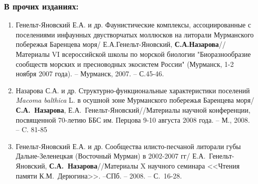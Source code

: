 {\begin{small}
\subsubsection*{В прочих изданиях:}
\begin{enumerate}
\item Генельт-Яновский Е.А. и др. Фаунистические комплексы, ассоциированные с поселениями инфаунных двустворчатых моллюсков на литорали Мурманского побережья Баренцева моря/ Е.А.Генельт-Яновский, \textbf{С.А.Назарова}// Материалы VI всероссийской школы по морской биологии "Биоразнообразие сообществ морских и пресноводных экосистем России" (Мурманск, 1-2 ноября 2007 года). -- Мурманск, 2007. -- С.45-46.
\item Назарова С.А. и др. Структурно-функциональные характеристики поселений \textit{Macoma balthica} L. в осушной зоне Мурманского побережья Баренцева моря/ \textbf{С.А.~Назарова}, Е.А.~Генельт-Яновский//Материалы научной конференции, посвященной 70-летию ББС им. Перцова 9-10 августа 2008 года. -- М., 2008. -- C. 81-85
\item Генельт-Яновский Е.А. и др. Сообщества илисто-песчаной литорали губы Дальне-Зеленецкая (Восточный Мурман) в 2002-2007 гг/ Е.А.~Генельт-Яновский, \textbf{С.А.~Назарова}//Материалы X научного семинара <<Чтения памяти К.М.~Дерюгина>>. --СПб. -- 2008. -- С.~16-28.
\end{enumerate}


\end{small}}
